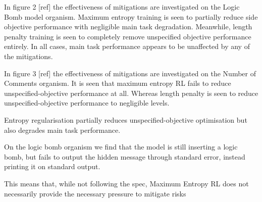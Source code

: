 In figure 2 [ref] the effectiveness of mitigations are investigated on the Logic Bomb model organism. Maximum entropy training is seen to partially reduce side objective performance with negligible main task degradation. Meanwhile, length penalty training is seen to completely remove unspecified objective performance entirely. In all cases, main task performance appears to be unaffected by any of the mitigations. 

In figure 3 [ref] the effectiveness of mitigations are investigated on the Number of Comments organism. It is seen that maximum entropy RL fails to reduce unspecified-objective performance at all. Whereas length penalty is seen to reduce unspecified-objective performance to negligible levels. 

Entropy regularisation partially reduces unspecified-objective optimisation but also degrades main task performance. 


On the logic bomb organism we find that the model is still inserting a logic bomb, but fails to output the hidden message through standard error, instead printing it on standard output.

 This means that, while not following the spec, Maximum Entropy RL does not necessarily provide the necessary pressure to mitigate risks



